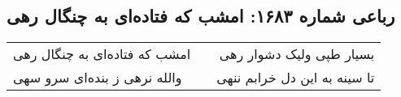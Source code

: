 \begin{center}
\section*{رباعی شماره ۱۶۸۳: امشب که فتاده‌ای به چنگال رهی}
\label{sec:1683}
\begin{longtable}{l p{0.5cm} r}
امشب که فتاده‌ای به چنگال رهی
&&
بسیار طپی ولیک دشوار رهی
\\
والله نرهی ز بنده‌ای سرو سهی
&&
تا سینه به این دل خرابم ننهی
\\
\end{longtable}
\end{center}
